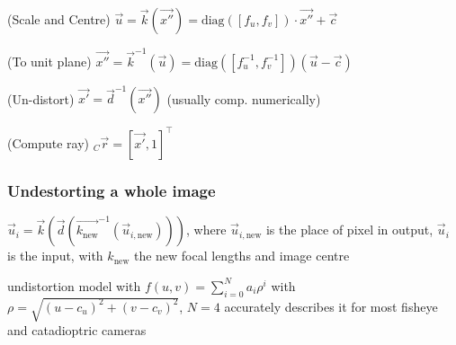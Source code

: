 (Scale and Centre) $\vec{u} = \vec{k}(\vec{x''}) = \text{diag}([f_u, f_v]) \cdot \vec{x''} + \vec{c}$

(To unit plane)
$\vec{x''} = \vec{k}^{-1}(\vec{u}) = \text{diag}([f_u^{-1}, f_v^{-1}]) (\vec{u} - \vec{c})$

(Un-distort)
$\vec{x'} = \vec{d}^{-1}(\vec{x''})$ (usually comp. numerically)

(Compute ray)
${_C}\vec{r} = [\vec{x'}, 1]^\top$


\subsubsection{Undestorting a whole image}
$\vec{u}_i = \vec{k}(\vec{d}(\vec{k_{\text{new}}}^{-1}(\vec{u}_{i, \text{new}})))$,
where $\vec{u}_{i, \text{new}}$ is the place of pixel in output, $\vec{u}_i$ is the input, with $k_{\text{new}}$ the new focal lengths and image centre

 undistortion model with $f(u, v) = \sum_{i = 0}^{N} a_i \rho^i$
with $\rho = \sqrt{(u - c_u)^2 + (v - c_v)^2}$, $N = 4$ accurately describes it for most fisheye and catadioptric cameras
